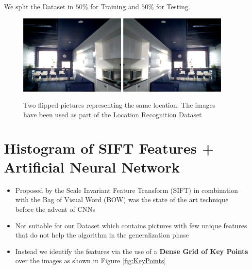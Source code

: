 \documentclass[a0, portrait]{IWIposter}
\begin{document}
\begin{multicols}{3}
\begin{itemize}
We split the Dataset in $50\%$ for Training and $50\%$ for Testing.
\end{itemize}

\begin{figure}
        \includegraphics[width=0.475\textwidth]{Position1.png}
        \hfill
        \includegraphics[width=0.475\textwidth]{Position2.png}
	\caption{Two flipped pictures representing the same location. The images have been used as part of the Location Recognition Dataset}
	\label{fig:FlippedExamples}
\end{figure}


\section*{Histogram of SIFT Features + Artificial Neural Network}
\begin{itemize}
	\item Proposed by \cite{lowe2004distinctive} the Scale Invariant Feature Transform (SIFT) in combination with the Bag of Visual Word (BOW) was the state of the art technique before the advent of CNNs
	\item Not suitable for our Dataset which contains pictures with few unique features that do not help the algorithm in the generalization phase
	\item Instead we identify the features via the use of a \textbf{Dense Grid of Key Points} over the images
	as shown in Figure \ref{fig:KeyPoints}


\end{itemize}
\end{multicols}
\end{document}
